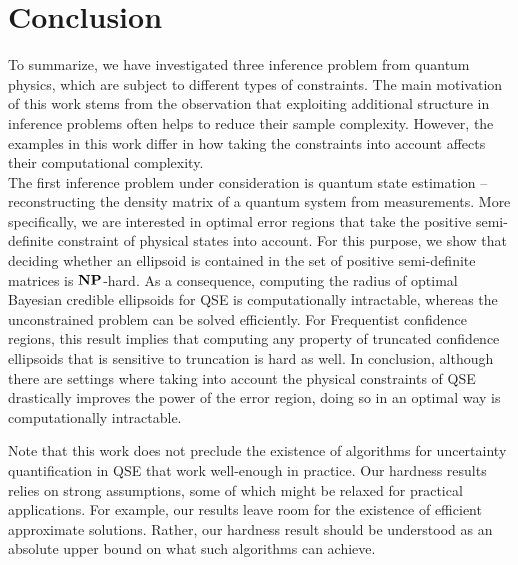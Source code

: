 
\chapter{Conclusion}%
\label{chap:conclusion}

To summarize, we have investigated three inference problem from quantum physics, which are subject to different types of constraints.
The main motivation of this work stems from the observation that exploiting additional structure in inference problems often helps to reduce their sample complexity.
However, the examples in this work differ in how taking the constraints into account affects their computational complexity.\\



The first inference problem under consideration is quantum state estimation -- reconstructing the density matrix of a quantum system from measurements.
More specifically, we are interested in optimal error regions that take the positive semi-definite constraint of physical states into account.
For this purpose, we show that deciding whether an ellipsoid is contained in the set of positive semi-definite matrices is $\mathbf{NP}$-hard.
As a consequence, computing the radius of optimal Bayesian credible ellipsoids for QSE is computationally intractable, whereas the unconstrained problem can be solved efficiently.
For Frequentist confidence regions, this result implies that computing any property of truncated confidence ellipsoids that is sensitive to truncation is hard as well.
In conclusion, although there are settings where taking into account the physical constraints of QSE drastically improves the power of the error region, doing so in an optimal way is computationally intractable.

Note that this work does not preclude the existence of algorithms for uncertainty quantification in QSE that work well-enough in practice.
Our hardness results relies on strong assumptions, some of which might be relaxed for practical applications.
For example, our results leave room for the existence of efficient approximate solutions.
Rather, our hardness result should be understood as an absolute upper bound on what such algorithms can achieve.\\



